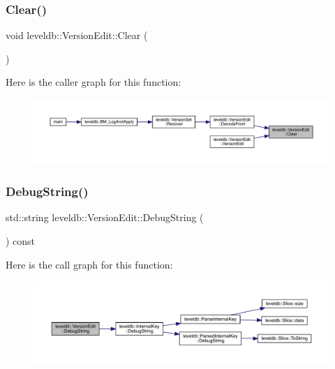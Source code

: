 \subsubsection{\texorpdfstring{Clear()}{Clear()}}
{\footnotesize\ttfamily void leveldb\+::\+Version\+Edit\+::\+Clear (\begin{DoxyParamCaption}{ }\end{DoxyParamCaption})}

Here is the caller graph for this function\+:
\nopagebreak
\begin{figure}[H]
\begin{center}
\leavevmode
\includegraphics[width=350pt]{classleveldb_1_1_version_edit_a259c9de14d58e231178904c1559e4b5e_icgraph}
\end{center}
\end{figure}
\mbox{\label{classleveldb_1_1_version_edit_a535f639edaa85da0d602b145528c6303}} 
\subsubsection{\texorpdfstring{DebugString()}{DebugString()}}
{\footnotesize\ttfamily std\+::string leveldb\+::\+Version\+Edit\+::\+Debug\+String (\begin{DoxyParamCaption}{ }\end{DoxyParamCaption}) const}

Here is the call graph for this function\+:
\nopagebreak
\begin{figure}[H]
\begin{center}
\leavevmode
\includegraphics[width=350pt]{classleveldb_1_1_version_edit_a535f639edaa85da0d602b145528c6303_cgraph}
\end{center}
\end{figure}
\mbox{\label{classleveldb_1_1_version_edit_ac0f431c5e8f08c74c697d8480f7c005f}} 
